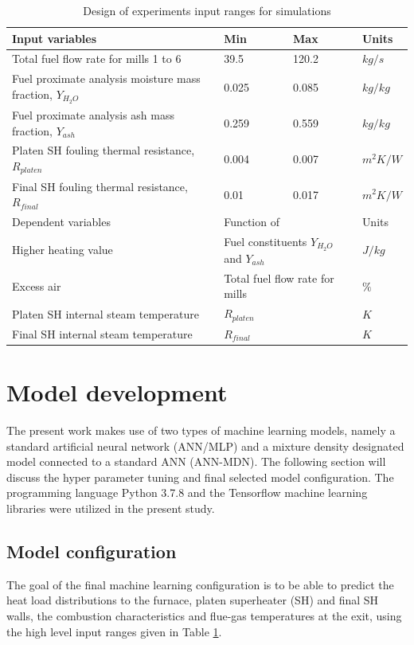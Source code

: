 \documentclass[a4paper,fleqn]{cas-dc}
\begin{document}
\begin{table}[h!]
\caption{Design of experiments input ranges for  simulations}\label{tbl_doe}
\begin{tabular*}{\tblwidth}{p{}p{}p{}p{}}
\toprule
 Input variables& Min& Max& Units \\ %
\midrule
 Total fuel flow rate for mills 1 to 6 & 39.5 & 120.2 & $kg/s$ \\
 Fuel proximate analysis moisture mass fraction, $Y_{H_2O}$ & 0.025 & 0.085 & $kg/kg$ \\
 Fuel proximate analysis ash mass fraction, $Y_{ash}$  & 0.259 & 0.559 & $kg/kg$ \\
 Platen SH fouling thermal resistance, $R_{platen}$  & 0.004 & 0.007 & $m^2K/W$ \\
 Final SH fouling thermal resistance, $R_{final}$  &0.01 & 0.017 & $m^2K/W$ \\
\midrule
Dependent variables& \multicolumn{2}{l}{Function of}& Units\\
\midrule
Higher heating value&\multicolumn{2}{l}{Fuel constituents $Y_{H_2O}$ and $Y_{ash}$}&$J/kg$\\
Excess air & \multicolumn{2}{l}{Total fuel flow rate for mills} & $\%$\\
Platen SH internal steam temperature& \multicolumn{2}{l}{$R_{platen}$} & $K$\\
Final SH internal steam temperature& \multicolumn{2}{l}{$R_{final}$} & $K$\\
\bottomrule
\end{tabular*}
\end{table}
\section{Model development}
The present work makes use of two types of machine learning models, namely a standard artificial neural network (ANN/MLP) and a mixture density designated model connected to a standard ANN (ANN-MDN). The following section will discuss the hyper parameter tuning and final selected model configuration. The programming language Python 3.7.8 and the Tensorflow machine learning libraries were utilized in the present study. 
\subsection{Model configuration}
The goal of the final machine learning configuration is to be able to predict the heat load distributions to the furnace, platen superheater (SH) and final SH walls, the combustion characteristics and flue-gas temperatures at the exit, using the high level input ranges given in Table \ref{tbl_doe}.\\
\end{document}
